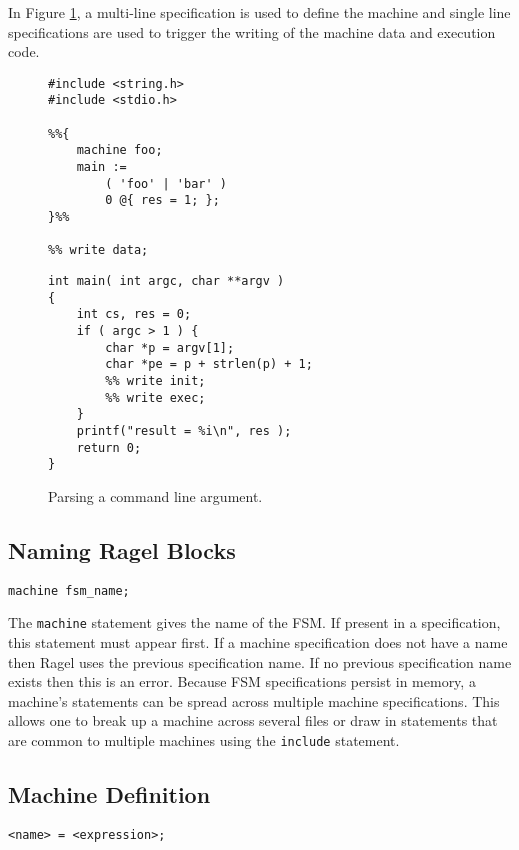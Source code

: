 \documentclass[letterpaper,11pt,oneside]{book}
\newcommand{\verbspace}{\vspace{10pt}}
\begin{document}
In Figure \ref{cmd-line-parsing}, a multi-line specification is used to define the
machine and single line specifications are used to trigger the writing of the machine
data and execution code.

\begin{figure}
\begin{multicols}{2}
\small
\begin{verbatim}
#include <string.h>
#include <stdio.h>

%%{ 
    machine foo;
    main := 
        ( 'foo' | 'bar' ) 
        0 @{ res = 1; };
}%%

%% write data;
\end{verbatim}
\columnbreak
\begin{verbatim}
int main( int argc, char **argv )
{
    int cs, res = 0;
    if ( argc > 1 ) {
        char *p = argv[1];
        char *pe = p + strlen(p) + 1;
        %% write init;
        %% write exec;
    }
    printf("result = %i\n", res );
    return 0;
}
\end{verbatim}
\end{multicols}
\caption{Parsing a command line argument.}
\label{cmd-line-parsing}
\end{figure}

\subsection{Naming Ragel Blocks}

\begin{verbatim}
machine fsm_name;
\end{verbatim}
\verbspace

The \verb|machine| statement gives the name of the FSM. If present in a
specification, this statement must appear first. If a machine specification
does not have a name then Ragel uses the previous specification name.  If no
previous specification name exists then this is an error. Because FSM
specifications persist in memory, a machine's statements can be spread across
multiple machine specifications.  This allows one to break up a machine across
several files or draw in statements that are common to multiple machines using
the \verb|include| statement.

\subsection{Machine Definition}
\label{definition}

\begin{verbatim}
<name> = <expression>;
\end{verbatim}
\verbspace
\end{document}
